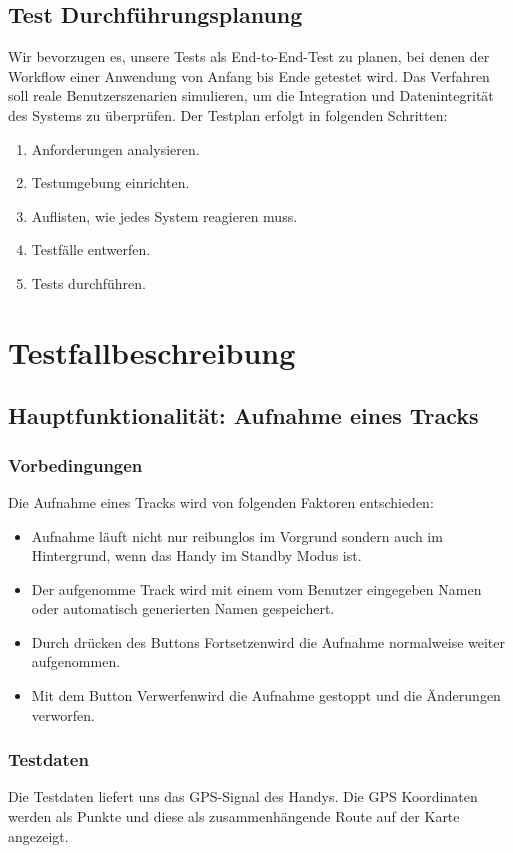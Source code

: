 \documentclass{article}
\begin{document}
\subsection{Test Durchführungsplanung}
	Wir bevorzugen es, unsere Tests als End-to-End-Test zu planen, bei denen der Workflow einer Anwendung von Anfang bis Ende getestet wird. Das Verfahren soll reale Benutzerszenarien simulieren, um die Integration und Datenintegrität des Systems zu überprüfen. Der Testplan erfolgt in folgenden Schritten: \par
	\begin{enumerate}
		\item Anforderungen analysieren.
		\item Testumgebung einrichten.
		\item Auflisten, wie jedes System reagieren muss.
		\item Testfälle entwerfen.
		\item Tests durchführen.
	\end{enumerate}

\section{Testfallbeschreibung}
\subsection{Hauptfunktionalität: Aufnahme eines Tracks}
\subsubsection{Vorbedingungen}
	Die Aufnahme eines Tracks wird von folgenden Faktoren entschieden:
	\begin{itemize}
		\item Aufnahme läuft nicht nur reibunglos im Vorgrund sondern auch im Hintergrund, wenn das Handy im Standby Modus ist.
		\item Der aufgenomme Track wird mit einem vom Benutzer eingegeben Namen oder automatisch generierten Namen gespeichert.
		\item Durch drücken des Buttons \glqq Fortsetzen\grqq\space wird die Aufnahme normalweise weiter aufgenommen.
		\item Mit dem Button \glqq Verwerfen\grqq\space wird die Aufnahme gestoppt und die Änderungen verworfen.
	\end{itemize}
\subsubsection{Testdaten}
	Die Testdaten liefert uns das GPS-Signal des Handys. Die GPS Koordinaten werden als Punkte und diese als zusammenhängende Route auf der Karte angezeigt.
\end{document}
